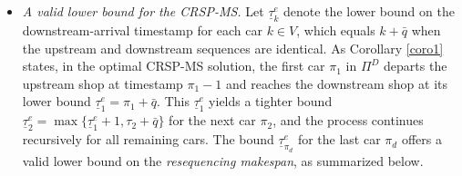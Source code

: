 \documentclass[12pt]{article}
\begin{document}



\begin{itemize}
    \item \textit{A valid lower bound for the CRSP-MS.} %
    Let $\underline{\tau}^e_k$ denote the lower bound on the downstream-arrival timestamp for each car $k\in V$, which equals $k+\bar{q}$ when the upstream and downstream sequences are identical. As Corollary \ref{coro1} states, in the optimal CRSP-MS solution, the first car $\pi_1$ in $\Pi^{D}$ departs the upstream shop at timestamp $\pi_1-1$ and reaches the downstream shop at its lower bound $\underline{\tau}^e_1=\pi_1+\bar{q}$. This $\underline{\tau}^e_1$ yields a tighter bound $\underline{\tau}^e_2=\max\{\underline{\tau}^e_1+1,\tau_2+\bar{q}\}$ for the next car $\pi_2$, and the process continues recursively for all remaining cars. The bound $\underline{\tau}^e_{\pi_d}$ for the last car $\pi_d$ offers a valid lower bound on the \textit{resequencing makespan}, as summarized below.


\end{itemize}
\end{document}
